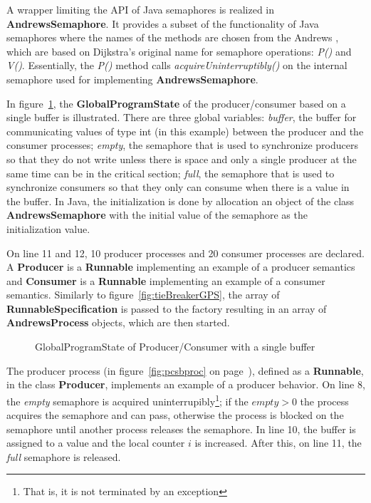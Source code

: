 \documentclass[11pt]{article} %
\begin{document}
A wrapper limiting the API of Java semaphores is realized in {\bfseries AndrewsSemaphore}. It provides a subset of the functionality of Java semaphores where the names of the methods are chosen from the Andrews \cite{andrews_foundations_2002}, which are based on Dijkstra's original name for semaphore operations: \emph{P()} and \emph{V()}. Essentially, the \emph{P()} method calls \emph{acquireUninterruptibly()} on the internal semaphore used for implementing {\bfseries AndrewsSemaphore}.



In figure~\ref{fig:pcsbgps}, the {\bfseries GlobalProgramState} of the producer/consumer based on a single buffer is illustrated. There are three global variables: \emph{buffer}, the buffer for communicating values of type int (in this example) between the producer and the consumer processes; \emph{empty}, the semaphore that is used to synchronize producers so that they do not write unless there is space and only a single producer at the same time can be in the critical section; \emph{full}, the semaphore that is used to synchronize consumers so that they only can consume when there is  a value in the buffer. In Java, the initialization is done by allocation an object of the class {\bfseries AndrewsSemaphore} with the initial value of the semaphore as the initialization value. 

On line 11 and 12, 10 producer processes and 20 consumer processes are declared. A {\bfseries Producer} is a {\bfseries Runnable} implementing an example of a producer semantics and {\bfseries Consumer} is a {\bfseries Runnable} implementing an example of a consumer semantics. Similarly to figure~\ref{fig:tieBreakerGPS}, the array of {\bfseries RunnableSpecification} is passed to the factory resulting in an array of {\bfseries AndrewsProcess} objects, which are then started. 

\lstset{inputpath=c:/git/IT325G/IT325G/examples/se/his/iit/it325g/examples/semaphores/multipleProducerConsumerSingleBuffer}
\begin{figure}[h]

\caption{GlobalProgramState of Producer/Consumer with a single buffer}
\label{fig:pcsbgps}
\end{figure}

The producer process (in figure~\ref{fig:pcsbproc} on page~\pageref{fig:pcsbproc}), defined as a {\bfseries Runnable}, in the class {\bfseries Producer}, implements an example of a producer behavior. On line 8, the \emph{ empty} semaphore is acquired uninterrupibly\footnote{That is, it is not terminated by an exception}; if the $\textit{empty}>0$ the process acquires the semaphore and can pass, otherwise the process is blocked on the semaphore until another process releases the semaphore. In line 10, the buffer is assigned to a value and the local counter $i$ is increased. After this, on line 11, the \emph{full} semaphore is released.
\end{document}
